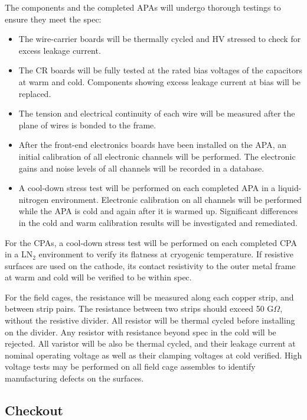 The components and the completed APAs will undergo thorough testings to ensure they meet the spec:
\begin{itemize}

\item The wire-carrier boards will be thermally cycled and HV stressed to check for excess leakage current.
\item The CR boards will be fully tested at the rated bias voltages of the capacitors at warm and cold.  Components showing excess leakage current at bias will be replaced.
\item The tension and electrical continuity of each wire will be 
measured after the plane of wires is bonded to the frame.
\item After the front-end electronics boards have been installed on 
the APA, an initial calibration of all electronic channels will be 
performed.  The electronic gains and noise levels of all channels will be 
recorded in a database.
\item A cool-down stress test will be performed on each completed 
APA in a liquid-nitrogen environment.  Electronic calibration on 
all channels will be performed while the APA is cold and again
after it is warmed up.  Significant differences in the cold and warm calibration 
results will be investigated and remediated.  
\end{itemize}

For the CPAs, a cool-down stress test will be performed on each completed 
CPA in a LN$_2$ environment to verify its flatness at cryogenic temperature. If resistive surfaces are used on the cathode, its contact resistivity to the outer metal frame at warm and cold will be verified to be within spec. 

For the field cages,  the resistance will be measured along each copper strip,  
and between strip pairs.  The resistance between two 
strips should exceed 50 G$\Omega$, without the resistive divider.  All resistor will be thermal cycled before installing on the divider.  Any resistor with resistance beyond spec in the cold will be rejected. All varistor will be also be thermal cycled, and their leakage current at nominal operating voltage as well as their clamping voltages at cold verified.  High voltage tests may be performed on all field cage assembles to identify manufacturing defects on the surfaces. 

\subsection{Checkout } 
\label{sec:v5-tpc-checkout-checkout}

